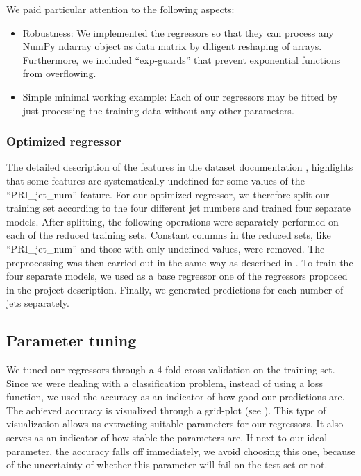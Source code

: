 \documentclass[11pt, a4paper, twocolumn]{article}
\begin{document}
We paid particular attention to the following aspects:
\begin{itemize}
    \vspace{-8pt}
    \item Robustness: We implemented the regressors so that they can process any NumPy ndarray object as data matrix by diligent reshaping of arrays. Furthermore, we included \enquote{exp-guards} that prevent exponential functions from overflowing.
    \vspace{-8pt}
    \item Simple minimal working example: Each of our regressors may be fitted by just processing the training data without any other parameters.
\end{itemize}

\vspace{-8pt}
\subsubsection{Optimized regressor}
\label{subsubsec:optimized regressor}
The detailed description of the features in the dataset documentation \cite{higgs2014}, highlights that some features are systematically undefined for some values of the \enquote{PRI\_jet\_num} feature. For our optimized regressor, we therefore split our training set according to the four different jet numbers and trained four separate models. After splitting, the following operations were separately performed  on each of the reduced training sets. Constant columns in the reduced sets, like \enquote{PRI\_jet\_num} and those with only undefined values, were removed. The preprocessing was then carried out in the same way as described in . To train the four separate models, we used as a base regressor one of the regressors proposed in the project description. Finally, we generated predictions for each number of jets separately.

\subsection{Parameter tuning}
\label{subsec:tuning}

We tuned our regressors through a 4-fold cross validation on the training set. Since we were dealing with a classification problem, instead of using a loss function, we used the accuracy as an indicator of how good our predictions are. The achieved accuracy is visualized through a grid-plot (see ). This type of visualization allows us extracting suitable parameters for our regressors. It also serves as an indicator of how stable the parameters are. If next to our ideal parameter, the accuracy falls off immediately, we avoid choosing this one, because of the uncertainty of whether this parameter will fail on the test set or not.
\end{document}

